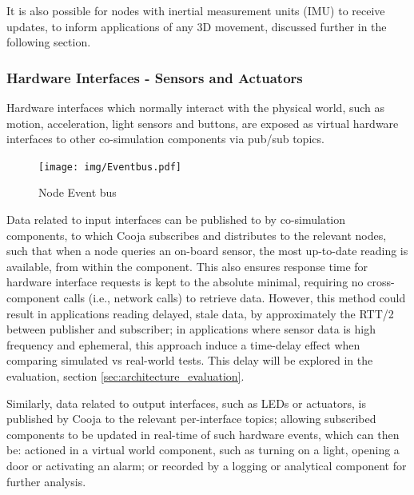 It is also possible for nodes with inertial measurement units (IMU) to receive updates, to inform applications of any 3D movement, discussed further in the following section.

\subsubsection{Hardware Interfaces - Sensors and Actuators} %
\label{ssub:hardware_interfaces_sensors}

Hardware interfaces which normally interact with the physical world, such as motion, acceleration, light sensors and buttons, are exposed as virtual hardware interfaces to other co-simulation components via pub/sub topics.

\begin{figure}[ht]
  \centering
  \texttt{[image: img/Eventbus.pdf]}
  \caption{Node Event bus}
  \label{fig:compression}
\end{figure}
Data related to input interfaces can be published to by co-simulation components, to which Cooja subscribes and distributes to the relevant nodes, such that when a node queries an on-board sensor, the most up-to-date reading is available, from within the component. This also ensures response time for hardware interface requests is kept to the absolute minimal, requiring no cross-component calls (i.e., network calls) to retrieve data. However, this method could result in applications reading delayed, stale data, by approximately the RTT/2 between publisher and subscriber; in applications where sensor data is high frequency and ephemeral, this approach induce a time-delay effect when comparing simulated vs real-world tests. This delay will be explored in the evaluation, section \ref{sec:architecture_evaluation}. 

Similarly, data related to output interfaces, such as LEDs or actuators, is published by Cooja to the relevant per-interface topics; allowing subscribed components to be updated in real-time of such hardware events, which can then be: actioned in a virtual world component, such as turning on a light, opening a door or activating an alarm; or recorded by a logging or analytical component for further analysis.



